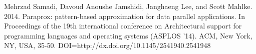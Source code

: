 \documentclass[12pt,conference]{IEEEtran}
\begin{document}









%
%
%
\begin{thebibliography}{1}

Mehrzad Samadi, Davoud Anoushe Jamshidi, Janghaeng Lee, and Scott Mahlke. 2014. Paraprox: pattern-based approximation for data parallel applications. In Proceedings of the 19th international conference on Architectural support for programming languages and operating systems (ASPLOS '14). ACM, New York, NY, USA, 35-50. DOI=http://dx.doi.org/10.1145/2541940.2541948 
\end{thebibliography}




\end{document}
